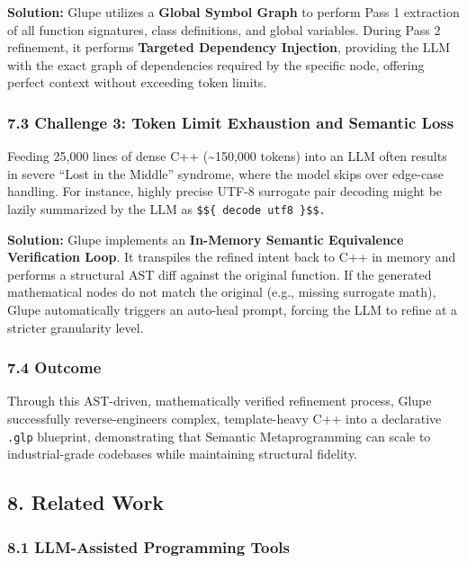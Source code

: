 \documentclass[11pt, a4paper]{article}
\begin{document}
\textbf{Solution:} Glupe utilizes a \textbf{Global Symbol Graph} to
perform Pass 1 extraction of all function signatures, class definitions,
and global variables. During Pass 2 refinement, it performs
\textbf{Targeted Dependency Injection}, providing the LLM with the exact
graph of dependencies required by the specific node, offering perfect
context without exceeding token limits.

\subsubsection{7.3 Challenge 3: Token Limit Exhaustion and Semantic
Loss}\label{challenge-3-token-limit-exhaustion-and-semantic-loss}

Feeding 25,000 lines of dense C++ (\textasciitilde150,000 tokens) into
an LLM often results in severe ``Lost in the Middle'' syndrome, where
the model skips over edge-case handling. For instance, highly precise
UTF-8 surrogate pair decoding might be lazily summarized by the LLM as
\texttt{\$\$\{\ decode\ utf8\ \}\$\$.}

\textbf{Solution:} Glupe implements an \textbf{In-Memory Semantic
Equivalence Verification Loop}. It transpiles the refined intent back to
C++ in memory and performs a structural AST diff against the original
function. If the generated mathematical nodes do not match the original
(e.g., missing surrogate math), Glupe automatically triggers an
auto-heal prompt, forcing the LLM to refine at a stricter granularity
level.

\subsubsection{7.4 Outcome}\label{outcome}

Through this AST-driven, mathematically verified refinement process,
Glupe successfully reverse-engineers complex, template-heavy C++ into a
declarative \texttt{.glp} blueprint, demonstrating that Semantic
Metaprogramming can scale to industrial-grade codebases while
maintaining structural fidelity.

\subsection{8. Related Work}\label{related-work}

\subsubsection{8.1 LLM-Assisted Programming
Tools}\label{llm-assisted-programming-tools}
\end{document}
